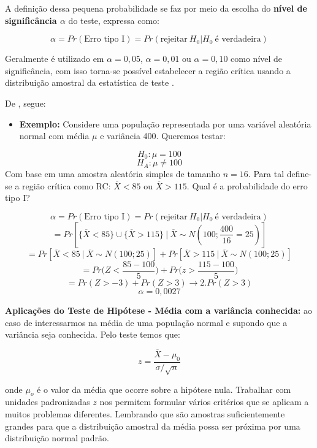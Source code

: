 \documentclass[
  openany]{book}
\providecommand{\tightlist}{%
  \setlength{\itemsep}{0pt}\setlength{\parskip}{0pt}}
\begin{document}
A definição dessa pequena probabilidade se faz por meio da escolha do \textbf{nível de significância \(\alpha\)} do teste, expressa como:

\begin{equation} 
 \alpha=Pr(\mbox{Erro tipo I})=Pr(\mbox{rejeitar} \ H_0|H_0 \ \mbox{é verdadeira})
  \label{eq:nivelsignificancia}
\end{equation}

Geralmente é utilizado em \(\alpha=0,05\), \(\alpha=0,01\) ou \(\alpha=0,10\) como nível de significância, com isso torna-se possível estabelecer a região crítica usando a distribuição amostral da estatística de teste \citep{fariaestatistic}.

De \citet{fariaestatistic}, segue:

\begin{itemize}
\tightlist
\item
  \textbf{Exemplo:} Considere uma população representada por uma variável aleatória normal com média \(\mu\) e variância 400. Queremos testar:
\end{itemize}

\[H_0:\mu = 100\]
\[H_A:\mu \neq 100\]
Com base em uma amostra aleatória simples de tamanho \(n=16\). Para tal define-se a região crítica como RC: \(\overline{X}<85\) ou \(\overline{X}>115\). Qual é a probabilidade do erro tipo I?

\[\alpha=Pr(\mbox{Erro tipo I})=Pr(\mbox{rejeitar} \ H_0|H_0 \ \mbox{é verdadeira})\]
\[=Pr[\{\overline{X}<85\} \cup \{\overline{X}>115\} \ | \ \overline{X}\sim N(100;\frac{400}{16}=25)]\]
\[=Pr[\overline{X}<85 \ | \  \overline{X}\sim N(100;25)]+Pr[\overline{X}>115 \ | \ \overline{X}\sim N(100;25)]\]
\[=Pr\bigg( Z<\frac{85-100}{5} \bigg)+Pr\bigg( z>\frac{115-100}{5} \bigg)\]
\[=Pr(Z>-3)+Pr(Z>3) \rightarrow 2.Pr(Z>3)\]
\[\alpha=0,0027\]

\textbf{Aplicações do Teste de Hipótese - Média com a variância conhecida:} ao caso de interessarmos na média de uma população normal e supondo que a variância seja conhecida. Pelo teste temos que:

\begin{equation} 
z=\frac{\overline{X}-\mu_0}{\sigma/\sqrt{n}}
  \label{eq:testehipmedia}
\end{equation}

onde \(\mu_o\) é o valor da média que ocorre sobre a hipótese nula. Trabalhar com unidades padronizadas \(z\) nos permitem formular vários critérios que se aplicam a muitos problemas diferentes. Lembrando que são amostras suficientemente grandes para que a distribuição amostral da média possa ser próxima por uma distribuição normal padrão.
\end{document}
